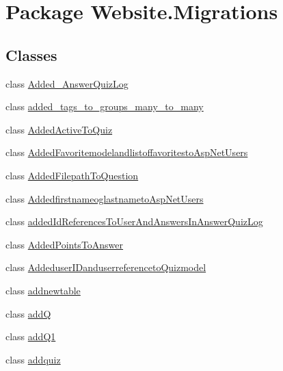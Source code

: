 \hypertarget{namespace_website_1_1_migrations}{}\section{Package Website.\+Migrations}
\label{namespace_website_1_1_migrations}
\subsection*{Classes}
\begin{DoxyCompactItemize}
\item 
class \hyperlink{class_website_1_1_migrations_1_1_added___answer_quiz_log}{Added\+\_\+\+Answer\+Quiz\+Log}
\item 
class \hyperlink{class_website_1_1_migrations_1_1added__tags__to__groups__many__to__many}{added\+\_\+tags\+\_\+to\+\_\+groups\+\_\+many\+\_\+to\+\_\+many}
\item 
class \hyperlink{class_website_1_1_migrations_1_1_added_active_to_quiz}{Added\+Active\+To\+Quiz}
\item 
class \hyperlink{class_website_1_1_migrations_1_1_added_favoritemodelandlistoffavoritesto_asp_net_users}{Added\+Favoritemodelandlistoffavoritesto\+Asp\+Net\+Users}
\item 
class \hyperlink{class_website_1_1_migrations_1_1_added_filepath_to_question}{Added\+Filepath\+To\+Question}
\item 
class \hyperlink{class_website_1_1_migrations_1_1_addedfirstnameoglastnameto_asp_net_users}{Addedfirstnameoglastnameto\+Asp\+Net\+Users}
\item 
class \hyperlink{class_website_1_1_migrations_1_1added_id_references_to_user_and_answers_in_answer_quiz_log}{added\+Id\+References\+To\+User\+And\+Answers\+In\+Answer\+Quiz\+Log}
\item 
class \hyperlink{class_website_1_1_migrations_1_1_added_points_to_answer}{Added\+Points\+To\+Answer}
\item 
class \hyperlink{class_website_1_1_migrations_1_1_addeduser_i_danduserreferenceto_quizmodel}{Addeduser\+I\+Danduserreferenceto\+Quizmodel}
\item 
class \hyperlink{class_website_1_1_migrations_1_1addnewtable}{addnewtable}
\item 
class \hyperlink{class_website_1_1_migrations_1_1add_q}{add\+Q}
\item 
class \hyperlink{class_website_1_1_migrations_1_1add_q1}{add\+Q1}
\item 
class \hyperlink{class_website_1_1_migrations_1_1addquiz}{addquiz}

\end{DoxyCompactItemize}
